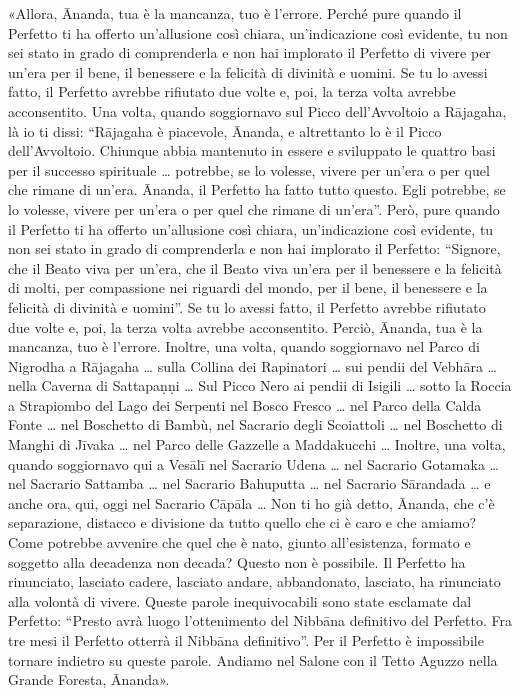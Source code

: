 «Allora, Ānanda, tua è la mancanza, tuo è l’errore. Perché pure quando
il Perfetto ti ha offerto un’allusione così chiara, un’indicazione così
evidente, tu non sei stato in grado di comprenderla e non hai implorato
il Perfetto di vivere per un’era per il bene, il benessere e la felicità
di divinità e uomini. Se tu lo avessi fatto, il Perfetto avrebbe
rifiutato due volte e, poi, la terza volta avrebbe acconsentito. Una
volta, quando soggiornavo sul Picco dell’Avvoltoio a Rājagaha, là io ti
dissi: “Rājagaha è piacevole, Ānanda, e altrettanto lo è il Picco
dell’Avvoltoio. Chiunque abbia mantenuto in essere e sviluppato le
quattro basi per il successo spirituale … potrebbe, se lo volesse,
vivere per un’era o per quel che rimane di un’era. Ānanda, il Perfetto
ha fatto tutto questo. Egli potrebbe, se lo volesse, vivere per un’era o
per quel che rimane di un’era”. Però, pure quando il Perfetto ti ha
offerto un’allusione così chiara, un’indicazione così evidente, tu non
sei stato in grado di comprenderla e non hai implorato il Perfetto:
“Signore, che il Beato viva per un’era, che il Beato viva un’era per il
benessere e la felicità di molti, per compassione nei riguardi del
mondo, per il bene, il benessere e la felicità di divinità e uomini”. Se
tu lo avessi fatto, il Perfetto avrebbe rifiutato due volte e, poi, la
terza volta avrebbe acconsentito. Perciò, Ānanda, tua è la mancanza, tuo
è l’errore. Inoltre, una volta, quando soggiornavo nel Parco di Nigrodha
a Rājagaha … sulla Collina dei Rapinatori … sui pendii del Vebhāra …
nella Caverna di Sattapaṇṇi … Sul Picco Nero ai pendii di Isigili …
sotto la Roccia a Strapiombo del Lago dei Serpenti nel Bosco Fresco …
nel Parco della Calda Fonte … nel Boschetto di Bambù, nel Sacrario degli
Scoiattoli … nel Boschetto di Manghi di Jīvaka … nel Parco delle
Gazzelle a Maddakucchi … Inoltre, una volta, quando soggiornavo qui a
Vesālī nel Sacrario Udena … nel Sacrario Gotamaka … nel Sacrario
Sattamba … nel Sacrario Bahuputta … nel Sacrario Sārandada … e anche
ora, qui, oggi nel Sacrario Cāpāla … Non ti ho già detto, Ānanda, che
c’è separazione, distacco e divisione da tutto quello che ci è caro e
che amiamo? Come potrebbe avvenire che quel che è nato, giunto
all’esistenza, formato e soggetto alla decadenza non decada? Questo non
è possibile. Il Perfetto ha rinunciato, lasciato cadere, lasciato
andare, abbandonato, lasciato, ha rinunciato alla volontà di vivere.
Queste parole inequivocabili sono state esclamate dal Perfetto: “Presto
avrà luogo l’ottenimento del Nibbāna definitivo del Perfetto. Fra tre
mesi il Perfetto otterrà il Nibbāna definitivo”. Per il Perfetto è
impossibile tornare indietro su queste parole. Andiamo nel Salone con il
Tetto Aguzzo nella Grande Foresta, Ānanda».


